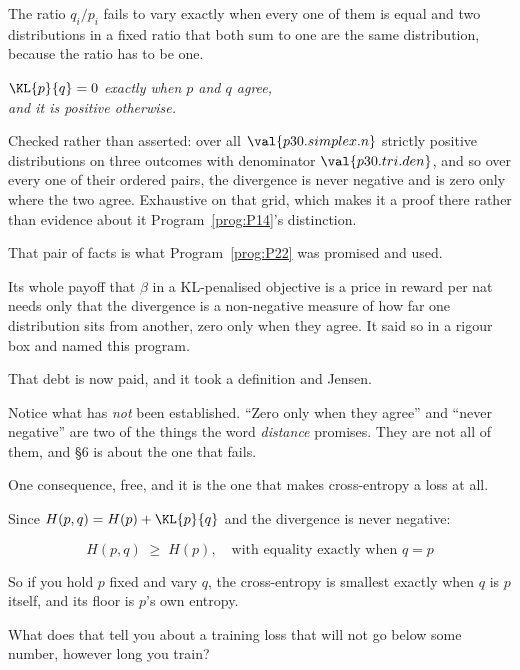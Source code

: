 \begin{fr}

The ratio $q_i/p_i$ fails to vary exactly when every one of them is equal
\dash{} and two distributions in a fixed ratio that both sum to one are the
same distribution, because the ratio has to be one.

\begin{center}
\emph{$\KL{p}{q} = 0$ exactly when $p$ and $q$ agree,\\
and it is positive otherwise.}
\end{center}

Checked rather than asserted: over all $\val{p30.simplex.n}$ strictly
positive distributions on three outcomes with denominator
$\val{p30.tri.den}$, and so over every one of their ordered pairs, the
divergence is never negative and is zero only where the two agree.
Exhaustive on that grid, which makes it a proof there rather than evidence
about it \dash{} Program~\ref{prog:P14}'s distinction.

That pair of facts is what Program~\ref{prog:P22} was promised and used.

Its whole payoff \dash{} that $\beta$ in a KL-penalised objective is a price
in reward per nat \dash{} needs only that the divergence is a non-negative
measure of how far one distribution sits from another, zero only when they
agree. It said so in a rigour box and named this program.

That debt is now paid, and it took a definition and Jensen.

\begin{note}
Notice what has \emph{not} been established. \enquote{Zero only when they
agree} and \enquote{never negative} are two of the things the word
\emph{distance} promises. They are not all of them, and §6 is about the one
that fails.
\end{note}
\end{fr}

\begin{fr}
One consequence, free, and it is the one that makes cross-entropy a loss at
all.

Since $H(p, q) = H(p) + \KL{p}{q}$ and the divergence is never negative:

\[ H(p, q) \;\ge\; H(p), \quad\text{with equality exactly when } q = p \]

So if you hold $p$ fixed and vary $q$, the cross-entropy is smallest exactly
when $q$ is $p$ itself, and its floor is $p$'s own entropy.

What does that tell you about a training loss that will not go below some
number, however long you train?
\dotline
\nextframe
\end{fr}

